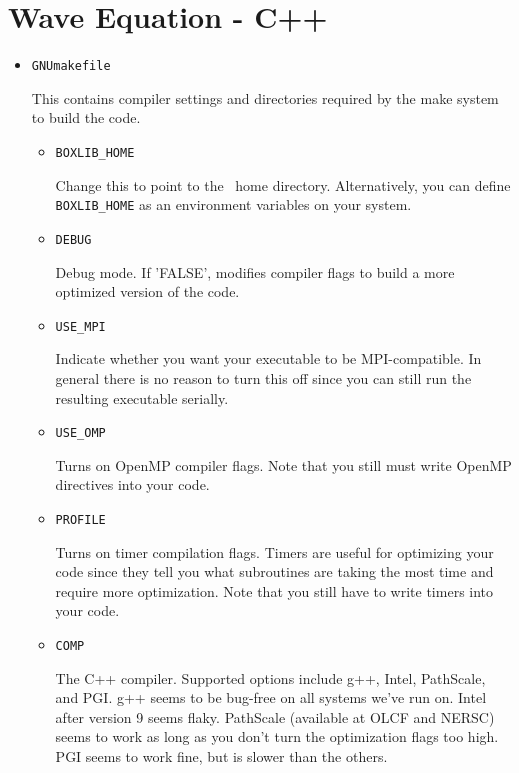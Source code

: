 \section{Wave Equation - C++}

\begin{itemize}
\item {\tt GNUmakefile}

This contains compiler settings and directories required by the make system to build the code.

  \begin{itemize}

    \item {\tt BOXLIB\_HOME}

    Change this to point to the \BoxLib\ home directory.  Alternatively, you can define {\tt BOXLIB\_HOME}
    as an environment variables on your system.

    \item {\tt DEBUG}
      
    Debug mode.  If 'FALSE', modifies compiler flags to build a more optimized version of the code.

    \item {\tt USE\_MPI}

    Indicate whether you want your executable to be MPI-compatible.  In general there is no reason to turn this
    off since you can still run the resulting executable serially.

    \item {\tt USE\_OMP}

    Turns on OpenMP compiler flags.  Note that you still must write OpenMP directives into your code.

    \item {\tt PROFILE}

    Turns on timer compilation flags.  Timers are useful for optimizing your code since they tell you 
    what subroutines are taking the most time and require more optimization.  Note that you still have 
    to write timers into your code.

    \item {\tt COMP}

    The C++ compiler.  Supported options include g++, Intel, PathScale, and PGI.  g++ seems to be bug-free
    on all systems we've run on.  Intel after version 9 seems flaky.  PathScale (available at OLCF and NERSC)
    seems to work as long as you don't turn the optimization flags too high.  PGI seems to work fine, but
    is slower than the others.


\end{itemize}
\end{itemize}
